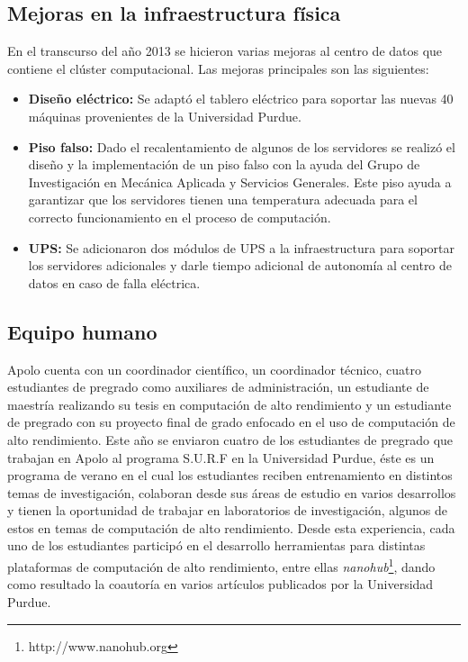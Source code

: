 \subsection{Mejoras en la infraestructura física}
En el transcurso del año 2013 se hicieron varias mejoras al centro de datos que contiene el clúster computacional. Las mejoras principales son las siguientes:
\begin{itemize}
\item \textbf{Diseño eléctrico:} Se adaptó el tablero eléctrico para soportar las nuevas 40 máquinas provenientes de la Universidad Purdue.
\item \textbf{Piso falso:} Dado el recalentamiento de algunos de los servidores se realizó el diseño y la implementación de un piso falso con la ayuda del Grupo de Investigación en Mecánica Aplicada y Servicios Generales. Este piso ayuda a garantizar que los servidores tienen una temperatura adecuada para el correcto funcionamiento en el proceso de computación.
\item \textbf{UPS:} Se adicionaron dos módulos de UPS a la infraestructura para soportar los servidores adicionales y darle tiempo adicional de autonomía al centro de datos en caso de falla eléctrica.
\end{itemize}

\subsection{Equipo humano}

Apolo cuenta con un coordinador científico, un coordinador técnico, cuatro estudiantes de pregrado como auxiliares de administración, un estudiante de maestría realizando su tesis en computación de alto rendimiento y un estudiante de pregrado con su proyecto final de grado enfocado en el uso de computación de alto rendimiento. Este año se enviaron cuatro de los estudiantes de pregrado que trabajan en Apolo al programa S.U.R.F en la Universidad Purdue, éste es un programa de verano en el cual los estudiantes reciben entrenamiento en distintos temas de investigación, colaboran desde sus áreas de estudio en varios desarrollos y tienen la oportunidad de trabajar en laboratorios de investigación, algunos de estos en temas de computación de alto rendimiento. Desde esta experiencia, cada uno de los estudiantes participó en el desarrollo herramientas para distintas plataformas de computación de alto rendimiento, entre ellas \textit{nanohub}\footnote{http://www.nanohub.org}, dando como resultado la coautoría en varios artículos publicados por la Universidad Purdue.

